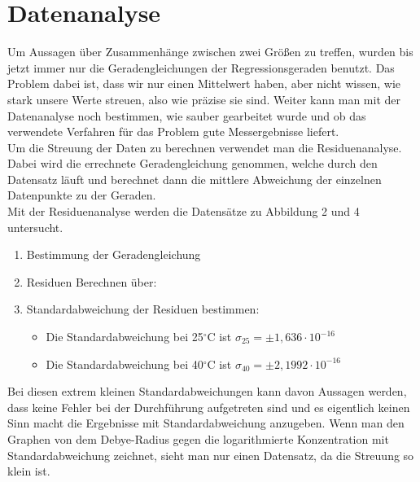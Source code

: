 \section{Datenanalyse}

Um Aussagen über Zusammenhänge zwischen zwei Größen zu treffen, wurden bis jetzt immer nur die Geradengleichungen der Regressionsgeraden benutzt.
Das Problem dabei ist, dass wir nur einen Mittelwert haben, aber nicht wissen, wie stark unsere Werte streuen, also wie präzise sie sind.
Weiter kann man mit der Datenanalyse noch bestimmen, wie sauber gearbeitet wurde und ob das verwendete Verfahren für das Problem gute Messergebnisse
liefert. \\
Um die Streuung der Daten zu berechnen verwendet man die Residuenanalyse. Dabei wird die errechnete Geradengleichung genommen, welche durch den
Datensatz läuft und berechnet dann die mittlere Abweichung der einzelnen Datenpunkte zu der Geraden. \\
Mit der Residuenanalyse werden die Datensätze zu Abbildung 2 und 4 untersucht.

\begin{enumerate}
    \item Bestimmung der Geradengleichung
    
    \item Residuen Berechnen über:
    
    \item Standardabweichung der Residuen bestimmen:
        \begin{itemize}
            \item Die Standardabweichung bei 25$^\circ$C ist $\sigma_{25} = \pm 1,636 \cdot 10^{-16}$
            \item Die Standardabweichung bei 40$^\circ$C ist $\sigma_{40} = \pm 2,1992 \cdot 10^{-16}$
        \end{itemize}
\end{enumerate} 

Bei diesen extrem kleinen Standardabweichungen kann davon Aussagen werden, dass keine Fehler bei der Durchführung aufgetreten sind und es 
eigentlich keinen Sinn macht die Ergebnisse mit Standardabweichung anzugeben. 
Wenn man den Graphen von dem Debye-Radius gegen die logarithmierte Konzentration mit Standardabweichung zeichnet, sieht man nur einen Datensatz,
da die Streuung so klein ist.

